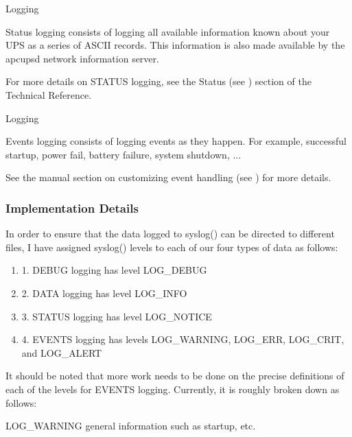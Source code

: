 {{{{{{{{{{{\smallSTATUS Logging}

Status logging consists of logging all available information known about your
UPS as a series of ASCII records. This information is also made available by
the apcupsd network information server.  

For more details on STATUS logging, see the Status (see 
) section of
the Technical Reference. 

{\smallEVENTS Logging}

Events logging consists of logging events as they happen. For example,
successful startup, power fail, battery failure, system shutdown, ...  

See the manual section on customizing event handling (see 
) for
more details. 

\label{Implementation-Details}

\subsubsection*{Implementation Details}

In order to ensure that the data logged to syslog() can be directed to
different files, I have assigned syslog() levels to each of our four types of
data as follows:  

\begin{enumerate}
\item 1. DEBUG logging has level LOG\_DEBUG  
\item 2. DATA logging has level LOG\_INFO  
\item 3. STATUS logging has level LOG\_NOTICE  
\item 4. EVENTS logging has levels LOG\_WARNING, LOG\_ERR, LOG\_CRIT, and
LOG\_ALERT  
\end{enumerate}

It should be noted that more work needs to be done on the precise definitions
of each of the levels for EVENTS logging. Currently, it is roughly broken down
as follows:  

LOG\_WARNING general information such as startup, etc.  

}}}}}}}}}}
